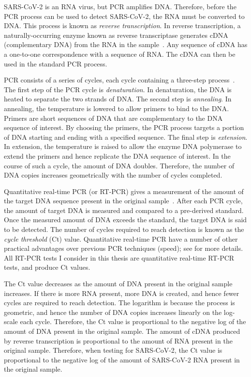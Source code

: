 \documentclass[thesis.tex]{subfiles}
\begin{document}
SARS-CoV-2 is an RNA virus, but PCR amplifies DNA.
Therefore, before the PCR process can be used to detect SARS-CoV-2, the RNA must be converted to DNA.
This process is known as \emph{reverse transcription}.
In reverse transcription, a naturally-occurring enzyme known as reverse transcriptase generates cDNA (complementary DNA) from the RNA in the sample~\autocites{valasekPower}.
Any sequence of cDNA has a one-to-one correspondence with a sequence of RNA.
The cDNA can then be used in the standard PCR process.

PCR consists of a series of cycles, each cycle containing a three-step process~\autocite{powledgePCR,garibyanPCR}.
The first step of the PCR cycle is \emph{denaturation}.
In denaturation, the DNA is heated to separate the two strands of DNA.
The second step is \emph{annealing}.
In annealing, the temperature is lowered to allow primers to bind to the DNA.
Primers are short sequences of DNA that are complementary to the DNA sequence of interest.
By choosing the primers, the PCR process targets a portion of DNA starting and ending with a specified sequence.
The final step is \emph{extension}.
In extension, the temperature is raised to allow the enzyme DNA polymerase to extend the primers and hence replicate the DNA sequence of interest.
In the course of such a cycle, the amount of DNA doubles.
Therefore, the number of DNA copies increases geometrically with the number of cycles completed.

Quantitative real-time PCR (or RT-PCR) gives a measurement of the amount of the target DNA sequence present in the original sample~\autocite{yangPCRdiagnostics}.
After each PCR cycle, the amount of target DNA is measured and compared to a pre-derived standard.
Once the measured amount of DNA exceeds the standard, the target DNA is said to be detected.
The number of cycles required to reach detection is known as the \emph{cycle threshold} (Ct) value.
Quantitative real-time PCR have a number of other practical advantages over previous PCR techniques (\eg speed); see \textcites{yangPCRdiagnostics}{valasekPower} for more details.
All RT-PCR tests I consider in this thesis are quantitative real-time RT-PCR tests, and produce Ct values.

The Ct value decreases as the amount of DNA present in the original sample increases.
If there is more RNA present, more DNA is created, and hence fewer cycles are required to reach detection.
The logarithm is because the process is geometric, and hence the number of DNA copies increases linearly on the log-scale each cycle.
Therefore, the Ct value is proportional to the negative log of the amount of DNA present in the original sample.
The amount of cDNA produced by reverse transcription is proportional to the amount of RNA present in the original sample.
Therefore, when testing for SARS-CoV-2, the Ct value is proportional to the negative log of the amount of SARS-CoV-2 RNA present in the original sample.
\end{document}
